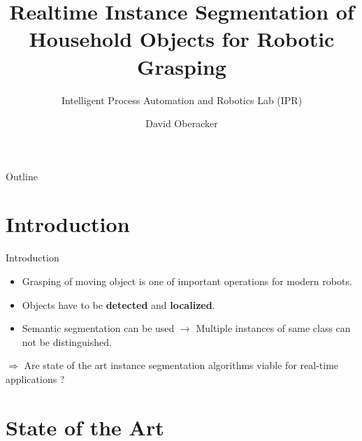 \documentclass[18pt]{beamer}
\title[Realtime Instance Segmentation of Household Objects]{Realtime Instance Segmentation of Household Objects for Robotic Grasping}
\subtitle{Intelligent Process Automation and Robotics Lab (IPR)}
\author{David Oberacker}
\institute{
	Institute for Anthropomatics and Robotics (IAR)
}
\begin{document}

\begin{frame}
\titlepage
\end{frame}

\begin{frame}{Outline}
\tableofcontents
\end{frame}

\section{Introduction}


\begin{frame}{Introduction}
    

    \begin{itemize}
        \item Grasping of moving object is one of important operations for modern robots.
        \item Objects have to be \textbf{detected} and \textbf{localized}.
        \item Semantic segmentation can be used $\rightarrow$ Multiple instances of same class can not be distinguished.
    \end{itemize}
    $\Rightarrow $ Are state of the art instance segmentation algorithms viable for real-time applications ?
    
\end{frame}

\section{State of the Art}
\end{document}
